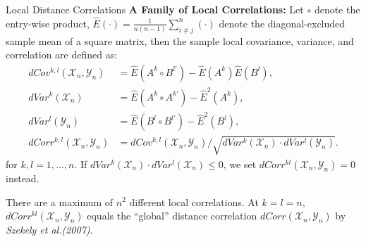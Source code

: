 \documentclass[mathserif,t]{beamer}
\newcommand{\G}{c}
\newcommand{\Mgc}{MGC}
\newcommand{\GG}{c}
\newcommand{\E}{\hat{E}}
\begin{document}
\begin{frame}{Local Distance Correlations}
\pause
\textbf{A Family of Local Correlations:} 
Let $\circ$ denote the entry-wise product, $\E(\cdot)=\frac{1}{n(n-1)}\sum_{i \neq j}^{n} (\cdot)$ denote the diagonal-excluded sample mean of a square matrix, then the sample local covariance, variance, and correlation are defined as:
\pause
\begin{align*}
dCov^{k,l}(\mathcal{X}_{n},\mathcal{Y}_{n}) &= \E(A^{k} \circ B^{l'})- \E(A^{k})\E(B^{l}),\\
dVar^{k}(\mathcal{X}_{n}) &=\E(A^{k} \circ A^{k'})- \E^2(A^{k}), \\
dVar^{l}(\mathcal{Y}_{n}) &=\E(B^{l} \circ B^{l'})- \E^2(B^{l}), \\
dCorr^{k,l}(\mathcal{X}_{n},\mathcal{Y}_{n}) &=dCov^{k,l}(\mathcal{X}_{n},\mathcal{Y}_{n}) / \sqrt{dVar^{k}(\mathcal{X}_{n}) \cdot dVar^{l}(\mathcal{Y}_{n})}.
\end{align*}
\pause
for $k,l=1,\ldots,n$. If $dVar^{k}(\mathcal{X}_{n}) \cdot dVar^{l}(\mathcal{X}_{n}) \leq 0$, we set $dCorr^{kl}(\mathcal{X}_{n},\mathcal{Y}_{n})=0$ instead. 

\pause
\medskip
There are a maximum of $n^2$ different local correlations. At $k=l=n$, $dCorr^{kl}(\mathcal{X}_{n},\mathcal{Y}_{n})$ equals the ``global'' distance correlation $dCorr(\mathcal{X}_{n},\mathcal{Y}_{n})$ by \textit{Szekely et al.(2007)}.
\end{frame}



\end{document}
